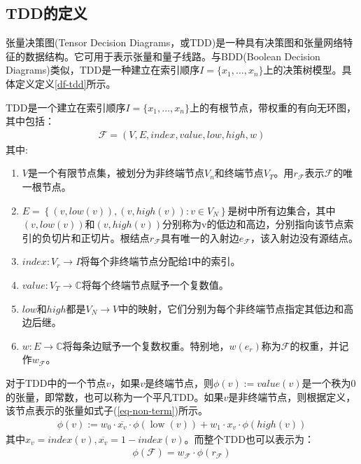 \subsection{TDD的定义}
张量决策图(Tensor Decision Diagrams，或TDD)是一种具有决策图和张量网络特征的数据结构\citep{Hong_2022}。它可用于表示张量和量子线路。与BDD(Boolean Decision Diagrams)类似，TDD是一种建立在索引顺序$I=\{x_1,\ldots,x_n\}$上的决策树模型。具体定义定义\ref{df-tdd}所示。
\begin{definition}
    \label{df-tdd}
    TDD是一个建立在索引顺序$I=\{x_1,\ldots,x_n\}$上的有根节点，带权重的有向无环图，其中包括：
    \begin{align}
        \mathcal{F}=\left(V,E,index,value,low,high,w\right)
    \end{align}
    其中:
    \begin{enumerate}
        \item $V$是一个有限节点集，被划分为非终端节点$V_n$和终端节点$V_T$。用$r_{\mathcal{F}}$表示$\mathcal{F}$的唯一根节点。
        \item $E=\left\{\left(v,low\left(v\right)\right),\left(v,high\left(v\right)\right):v\in V_N\right\}$是树中所有边集合，其中$\left(v,low\left(v\right)\right)$和$\left(v,high\left(v\right)\right)$分别称为v的低边和高边，分别指向该节点索引的负切片和正切片。根结点$r_{\mathcal{F}}$具有唯一的入射边$e_{\mathcal{F}}$，该入射边没有源结点。
        \item $index:V_r\rightarrow I$将每个非终端节点分配给I中的索引。
        \item $value:V_T\rightarrow\mathbb{C}$将每个终端节点赋予一个复数值。
        \item $low$和$high$都是$V_N\rightarrow V$中的映射，它们分别为每个非终端节点指定其低边和高边后继。
        \item $w:E\rightarrow\mathbb{C}$将每条边赋予一个复数权重。特别地，$w\left(e_r\right)$称为$\mathcal{F}$的权重，并记作$w_{\mathcal{F}}$。
    \end{enumerate} 
\end{definition}


对于TDD中的一个节点$v$，如果$v$是终端节点，则$\phi\left(v\right):= value (v)$是一个秩为$0$的张量，即常数，也可以称为一个平凡TDD。如果$v$是非终端节点，则根据定义，该节点表示的张量如式子(\ref{eq-non-term})所示。
\begin{align}
    \label{eq-non-term}
    \phi(v):=w_{0} \cdot \overline{x_{v}} \cdot \phi(\operatorname{low}(v))+w_{1} \cdot x_{v} \cdot \phi(h i g h(v))
\end{align}
其中$x_v=index\left(v\right),\overline{x_{v}}=1-index\left(v\right)$。而整个TDD也可以表示为：
\begin{align}
    \phi\left(\mathcal{F}\right)=w_{\mathcal{F}}\cdot\phi\left(r_{\mathcal{F}}\right)
\end{align}

